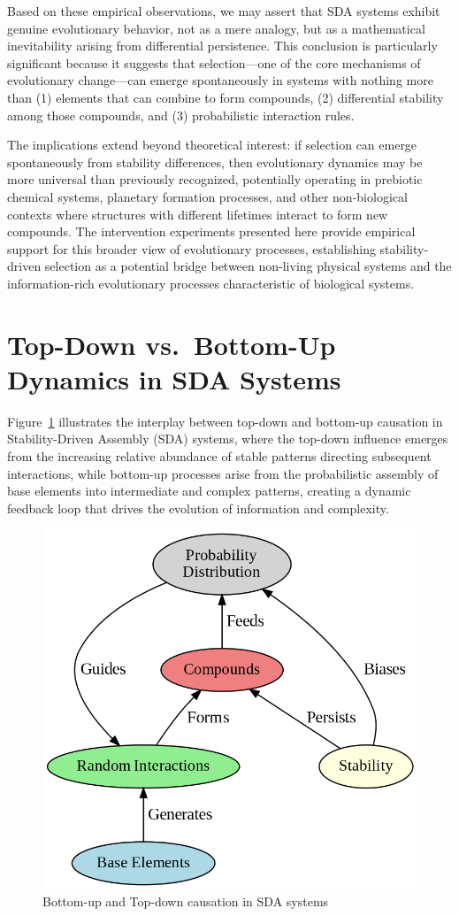 \documentclass[preprint,12pt]{elsarticle}
\begin{document}
Based on these empirical observations, we may assert that SDA systems exhibit genuine evolutionary behavior, not as a mere analogy, but as a mathematical inevitability arising from differential persistence. This conclusion is particularly significant because it suggests that selection—one of the core mechanisms of evolutionary change—can emerge spontaneously in systems with nothing more than (1) elements that can combine to form compounds, (2) differential stability among those compounds, and (3) probabilistic interaction rules.

The implications extend beyond theoretical interest: if selection can emerge spontaneously from stability differences, then evolutionary dynamics may be more universal than previously recognized, potentially operating in prebiotic chemical systems, planetary formation processes, and other non-biological contexts where structures with different lifetimes interact to form new compounds. The intervention experiments presented here provide empirical support for this broader view of evolutionary processes, establishing stability-driven selection as a potential bridge between non-living physical systems and the information-rich evolutionary processes characteristic of biological systems.


\section{Top-Down vs.\ Bottom-Up Dynamics in SDA Systems}
\label{sec:topdown-bottomup}

Figure~\ref{fig:figure_10} illustrates the interplay between top-down and bottom-up causation in Stability-Driven Assembly (SDA) systems, where the top-down influence emerges from the increasing relative abundance of stable patterns directing subsequent interactions, while bottom-up processes arise from the probabilistic assembly of base elements into intermediate and complex patterns, creating a dynamic feedback loop that drives the evolution of information and complexity.

\begin{figure}[h]
    \centering
    \includegraphics[width=0.7\linewidth,height=0.7\linewidth]{figure_10.png}
    \caption{Bottom-up and Top-down causation in SDA systems}
    \label{fig:figure_10}
\end{figure}
\end{document}
